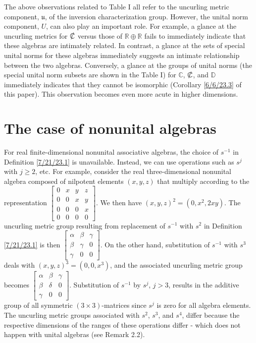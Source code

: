 \documentclass{amsart}
\numberwithin{equation}{section}
\theoremstyle{definition}
\numberwithin{theorem}{section}
\begin{document}
 The above observations related to Table I all refer to the uncurling metric component, $\mathfrak{u}$, of the inversion characterization group.  However, the unital norm component, $U$, can also play an important role.  For example, a glance at the uncurling metrics for $\slashed{\mathbb{C}}$ versus those of $\mathbb{R}\oplus\mathbb{R}$ fails to immediately indicate that these algebras are intimately related.   In contrast, a glance at the sets of special unital norms for these algebras immediately suggests an intimate relationship between the two algebras. Conversely, a glance at the groups of unital norms (the special unital norm subsets are shown in the Table I) for $\mathbb{C}$, $\slashed{\mathbb{C}}$, and $\mathbb{D}$ immediately indicates that they cannot be isomorphic (Corollary \ref{6/6/23.3} of this paper).  This observation becomes even more acute in higher dimensions.  
 
 \section{The case of nonunital algebras}

For real finite-dimensional nonunital associative algebras, the choice of $s^{-1}$ in Definition \ref{7/21/23.1} is unavailable.  Instead, we can use operations such as $s^j$ with $j\ge 2$, etc.   For example, consider the real three-dimensional nonunital algebra composed of nilpotent elements $(x,y,z)$ that multiply according to the representation
  $ \left[
\begin{array}{ccccc}
0 & x & y & z  \\
0 & 0 & x & y \\
0 & 0 & 0 & x \\
0 & 0 & 0 & 0
\end{array}
\right] $.  We then have $(x,y,z)^2 = (0,x^2, 2xy)$.  The uncurling metric group resulting from replacement of $s^{-1}$ with  $s^2$ in Definition \ref{7/21/23.1} is then $\left[
\begin{array}{ccccc}
\alpha & \beta & \gamma   \\
\beta & \gamma & 0 \\
\gamma & 0 & 0  
\end{array}
\right] $.  On the other hand, substitution of $s^{-1}$ with $s^3$  deals with $(x,y,z)^3 = (0,0, x^3)$, and the associated uncurling metric group becomes $\left[
\begin{array}{ccccc}
\alpha & \beta & \gamma   \\
\beta & \delta & 0 \\
\gamma & 0 & 0  
\end{array}
\right] $.  Substitution of $s^{-1}$ by $s^j$, $j>3$, results in the additive group of all symmetric $(3\times 3)$-matrices since $s^j$ is zero for all algebra elements.  The uncurling metric groups associated with $s^2$, $s^3$, and $s^4$, differ because the respective dimensions of the ranges of these operations differ - which does not happen with unital algebras (see Remark 2.2).
\end{document}
